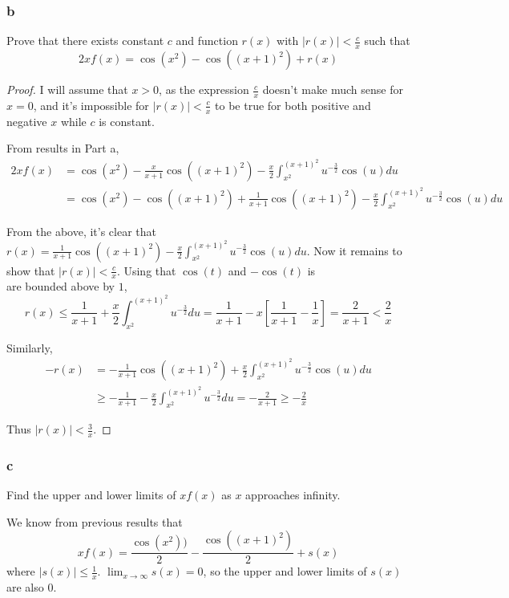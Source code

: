 \documentclass{amsart}
\begin{document}
\subsubsection*{b}
Prove that there exists constant $c$ and function $r(x)$ with $|r(x)| < \frac{c}{x}$ such that
\[
2xf(x) = \cos(x^2) - \cos((x+1)^2) + r(x)
\]

\begin{proof}
I will assume that $x>0$, as the expression $\frac{c}{x}$ doesn't make much sense for $x = 0$, and it's impossible for $|r(x)| < \frac{c}{x}$ to be true for both positive and negative $x$ while $c$ is constant.

From results in Part a,
\begin{align*}
2xf(x) &= \cos(x^2) - \frac{x}{x+1}\cos((x+1)^2)
- \frac{x}{2} \int_{x^2}^{(x+1)^2} u^{-\frac{3}{2}} \cos(u)du \\
&= \cos(x^2) - \cos((x+1)^2)
+ \frac{1}{x+1}\cos((x+1)^2) - \frac{x}{2} \int_{x^2}^{(x+1)^2} u^{-\frac{3}{2}} \cos(u)du
\end{align*}

From the above, it's clear that $r(x) = \frac{1}{x+1}\cos((x+1)^2) - \frac{x}{2} \int_{x^2}^{(x+1)^2} u^{-\frac{3}{2}} \cos(u)du$. Now it remains to show that $|r(x)| < \frac{c}{x}$. Using that $\cos(t)$ and $-\cos(t)$ is\\are bounded above by $1$,
\[
r(x) \leq \frac{1}{x+1} + \frac{x}{2}\int_{x^2}^{(x+1)^2} u^{-\frac{3}{2}}du
= \frac{1}{x+1} - x\left[\frac{1}{x+1} - \frac{1}{x} \right]
= \frac{2}{x+1} < \frac{2}{x}
\]

Similarly,
\begin{align*}
-r(x) &= -\frac{1}{x+1}\cos((x+1)^2) + \frac{x}{2} \int_{x^2}^{(x+1)^2} u^{-\frac{3}{2}} \cos(u)du \\
&\geq -\frac{1}{x+1} - \frac{x}{2}\int_{x^2}^{(x+1)^2} u^{-\frac{3}{2}}du
= -\frac{2}{x+1} \geq -\frac{2}{x}
\end{align*}

Thus $|r(x)| < \frac{3}{x}$.

\end{proof}

\subsubsection*{c}
Find the upper and lower limits of $xf(x)$ as $x$ approaches infinity.

We know from previous results that
\[
xf(x) = \frac{\cos(x^2))}{2} - \frac{\cos((x+1)^2)}{2} + s(x)
\]
where $|s(x)| \leq \frac{1}{x}$. $\lim_{x\rightarrow\infty} s(x) = 0$, so the upper and lower limits of $s(x)$ are also $0$.
\end{document}
